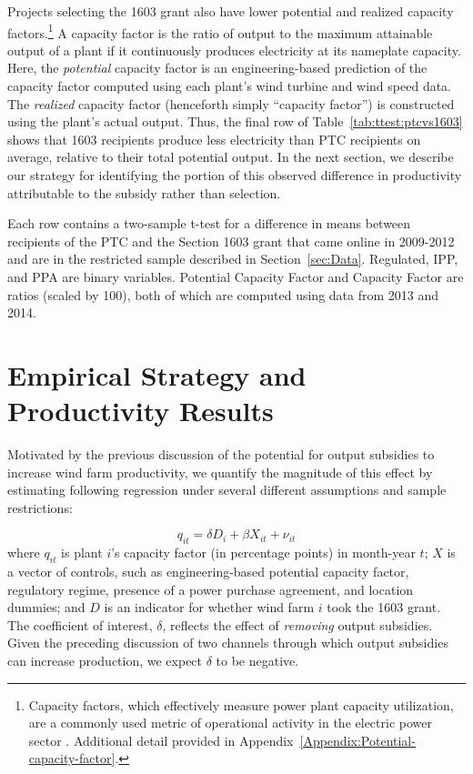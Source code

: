 \documentclass[12pt]{article}
\begin{document}
Projects selecting the 1603 grant also have lower potential and realized capacity factors.\footnote{Capacity factors, which effectively measure power plant capacity utilization, are a commonly used metric of operational activity in the electric power sector \citep[see, for example,][]{davis_deregulation_2012}. Additional detail provided in Appendix~\ref{Appendix:Potential-capacity-factor}.} A capacity factor is the ratio of output to the maximum attainable output of a plant if it continuously produces electricity at its nameplate capacity. Here, the \textit{potential} capacity factor is an engineering-based prediction of the capacity factor computed using each plant's wind turbine and wind speed data. The \textit{realized} capacity factor (henceforth simply ``capacity factor'') is constructed using the plant's actual output. Thus, the final row of Table~\ref{tab:ttest:ptcvs1603} shows that 1603 recipients produce less electricity than PTC recipients on average, relative to their total potential output. In the next section, we describe our strategy for identifying the portion of this observed difference in productivity attributable to the subsidy rather than selection.

\begin{table}[h]
\caption{Comparison of 2009-2012 Projects by Policy Choice\label{tab:ttest:ptcvs1603}}

\footnotesize
Each row contains a two-sample t-test for a difference in means between recipients of the PTC and the Section 1603 grant that came online in 2009-2012 and are in the restricted sample described in Section~\ref{sec:Data}. Regulated, IPP, and PPA are binary variables. Potential Capacity Factor and Capacity Factor are ratios (scaled by 100), both of which are computed using data from 2013 and 2014.
\end{table}

\section{Empirical Strategy and Productivity Results \label{sec:Empirical-Strategy}}

Motivated by the previous discussion of the potential for output subsidies to increase wind farm productivity, we quantify the magnitude of this effect by estimating following regression under several different assumptions and sample restrictions:

\begin{equation}
q_{it}=\delta D_{i}+\beta X_{it}+\nu_{it}\label{eq:second_stage}
\end{equation}
where $q_{it}$ is plant $i$'s capacity factor (in percentage points) in month-year $t$; $X$ is a vector of controls, such as engineering-based potential capacity factor, regulatory regime, presence of a power purchase agreement, and location dummies; and $D$ is an indicator for whether wind farm $i$ took the 1603 grant. The coefficient of interest, $\delta$, reflects the effect of \emph{removing} output subsidies. Given the preceding discussion of two channels through which output subsidies can increase production, we expect $\delta$ to be negative.
\end{document}
